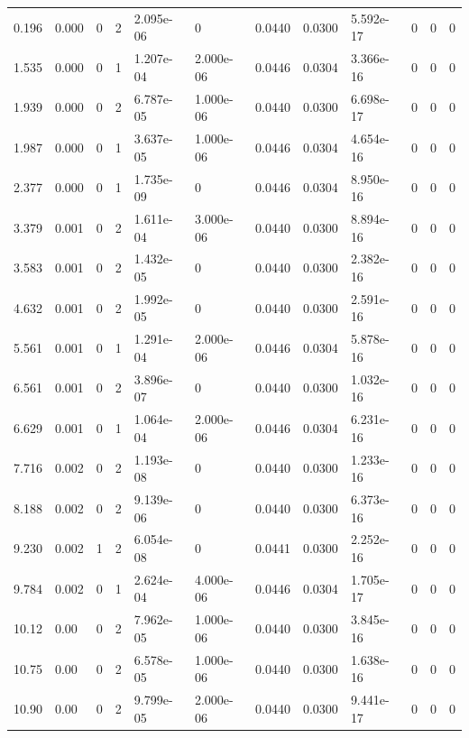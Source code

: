 \documentclass[preview]{standalone}
\begin{document}
{{\begin{tabular}{L{1.2cm}C{1.2cm} C{0.3cm}C{0.5cm} C{1.4cm}C{1.4cm} C{1.4cm}C{1.4cm} C{1.6cm}C{1.6cm} C{1.6cm}C{1.6cm}}
  0.196  &  0.000  & 0     &  2 &  2.095e-06  & 0  &  0.0440&   0.0300& 5.592e-17 & 0   &  0 & 0  \\ 
  1.535  &  0.000  & 0     &  1 &  1.207e-04  & 2.000e-06  &  0.0446&   0.0304& 3.366e-16 & 0   &  0 & 0  \\ 
  1.939  &  0.000  & 0     &  2 &  6.787e-05  & 1.000e-06  &  0.0440&   0.0300& 6.698e-17 & 0   &  0 & 0  \\ 
  1.987  &  0.000  & 0     &  1 &  3.637e-05  & 1.000e-06  &  0.0446&   0.0304& 4.654e-16 & 0   &  0 & 0  \\ 
  2.377  &  0.000  & 0     &  1 &  1.735e-09  & 0  &  0.0446&   0.0304& 8.950e-16 & 0   &  0 & 0  \\ 
  3.379  &  0.001  & 0     &  2 &  1.611e-04  & 3.000e-06  &  0.0440&   0.0300& 8.894e-16 & 0   &  0 & 0  \\ 
  3.583  &  0.001  & 0     &  2 &  1.432e-05  & 0  &  0.0440&   0.0300& 2.382e-16 & 0   &  0 & 0  \\ 
  4.632  &  0.001  & 0     &  2 &  1.992e-05  & 0  &  0.0440&   0.0300& 2.591e-16 & 0   &  0 & 0  \\ 
  5.561  &  0.001  & 0     &  1 &  1.291e-04  & 2.000e-06  &  0.0446&   0.0304& 5.878e-16 & 0   &  0 & 0  \\ 
  6.561  &  0.001  & 0     &  2 &  3.896e-07  & 0  &  0.0440&   0.0300& 1.032e-16 & 0   &  0 & 0  \\ 
  6.629  &  0.001  & 0     &  1 &  1.064e-04  & 2.000e-06  &  0.0446&   0.0304& 6.231e-16 & 0   &  0 & 0  \\ 
  7.716  &  0.002  & 0     &  2 &  1.193e-08  & 0  &  0.0440&   0.0300& 1.233e-16 & 0   &  0 & 0  \\ 
  8.188  &  0.002  & 0     &  2 &  9.139e-06  & 0  &  0.0440&   0.0300& 6.373e-16 & 0   &  0 & 0  \\ 
  9.230  &  0.002  & 1     &  2 &  6.054e-08  & 0  &  0.0441&   0.0300& 2.252e-16 & 0   &  0 & 0  \\ 
  9.784  &  0.002  & 0     &  1 &  2.624e-04  & 4.000e-06  &  0.0446&   0.0304& 1.705e-17 & 0   &  0 & 0  \\ 
  10.12  &  0.00  & 0     &  2 &  7.962e-05  & 1.000e-06  &  0.0440&   0.0300& 3.845e-16 & 0   &  0 & 0  \\ 
  10.75  &  0.00  & 0     &  2 &  6.578e-05  & 1.000e-06  &  0.0440&   0.0300& 1.638e-16 & 0   &  0 & 0  \\ 
  10.90  &  0.00  & 0     &  2 &  9.799e-05  & 2.000e-06  &  0.0440&   0.0300& 9.441e-17 & 0   &  0 & 0  \\ 

\end{tabular}}}
\end{document}
